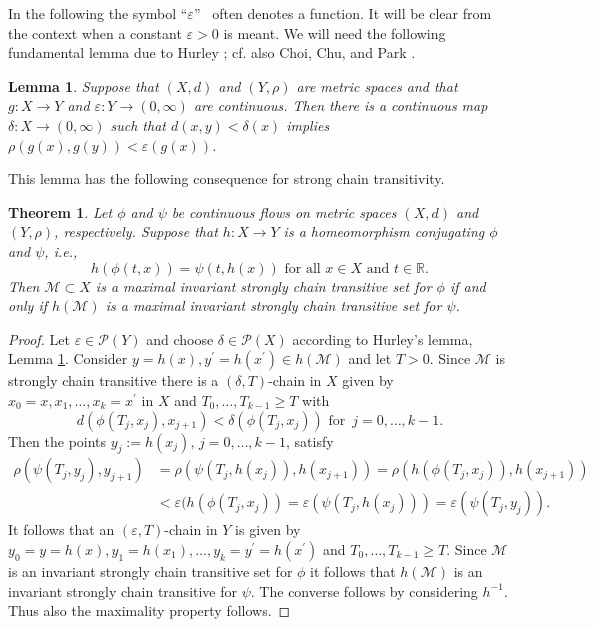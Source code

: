 \documentclass[preprint,12pt]{elsarticle}
\newtheorem{theorem}{Theorem}
\newtheorem{lemma}{Lemma}
\begin{document}
In the following the symbol \textquotedblleft$\varepsilon$\textquotedblright%
\ often denotes a function. It will be clear from the context when a constant
$\varepsilon>0$ is meant. We will need the following fundamental lemma due to
Hurley \cite[Lemma 2]{Hur95}; cf. also Choi, Chu, and Park \cite[Lemma
2]{ChoiCP02}.

\begin{lemma}
\label{Lemma2_Hurley}Suppose that $(X,d)$ and $(Y,\rho)$ are metric spaces and
that $g:X\rightarrow Y$ and $\varepsilon:Y\rightarrow(0,\infty)$ are
continuous. Then there is a continuous map $\delta:X\rightarrow(0,\infty)$
such that $d(x,y)<\delta(x)$ implies $\rho(g(x),g(y))<\varepsilon(g(x))$.
\end{lemma}

This lemma has the following consequence for strong chain transitivity.

\begin{theorem}
\label{Theorem_components}Let $\phi$ and $\psi$ be continuous flows on metric
spaces $(X,d)$ and $(Y,\rho)$, respectively. Suppose that $h:X\rightarrow Y$
is a homeomorphism conjugating $\phi$ and $\psi$, i.e.,
\[
h(\phi(t,x))=\psi(t,h(x))\text{ for all }x\in X\text{ and }t\in\mathbb{R}%
\text{.}%
\]
Then $\mathcal{M}\subset X$ is a maximal invariant strongly chain transitive
set for $\phi$ if and only if $h(\mathcal{M})$ is a maximal invariant strongly
chain transitive set for $\psi$.
\end{theorem}

\begin{proof}
Let $\varepsilon\in\mathcal{P}(Y)$ and choose $\delta\in\mathcal{P}(X)$
according to Hurley's lemma, Lemma \ref{Lemma2_Hurley}. Consider
$y=h(x),y^{\prime}=h(x^{\prime})\in h(\mathcal{M})$ and let $T>0$. Since
$\mathcal{M}$ is strongly chain transitive there is a $(\delta,T)$-chain in
$X$ given by $x_{0}=x,x_{1},\ldots,x_{k}=x^{\prime}$ in $X$ and $T_{0}%
,\ldots,T_{k-1}\geq T$ with%
\[
d(\phi(T_{j},x_{j}),x_{j+1})<\delta(\phi(T_{j},x_{j}))\text{ for }%
\,j=0,\ldots,k-1.
\]
Then the points $y_{j}:=h(x_{j}),\,j=0,\ldots,k-1$, satisfy%
\begin{align*}
\rho(\psi(T_{j},y_{j}),y_{j+1})  &  =\rho(\psi(T_{j},h(x_{j})),h(x_{j+1}%
))=\rho(h(\phi(T_{j},x_{j})),h(x_{j+1}))\\
&  <\varepsilon(h(\phi(T_{j},x_{j}))=\varepsilon(\psi(T_{j},h(x_{j}%
)))=\varepsilon(\psi(T_{j},y_{j})).
\end{align*}
It follows that an $(\varepsilon,T)$-chain in $Y$ is given by $y_{0}%
=y=h(x),y_{1}=h(x_{1}),\ldots,\allowbreak y_{k}=y^{\prime}=h(x^{\prime})$ and
$T_{0},\ldots,T_{k-1}\geq T$. Since $\mathcal{M}$ is an invariant strongly
chain transitive set for $\phi$ it follows that $h(\mathcal{M})$ is an
invariant strongly chain transitive for $\psi$. The converse follows by
considering $h^{-1}$. Thus also the maximality property follows.
\end{proof}
\end{document}
